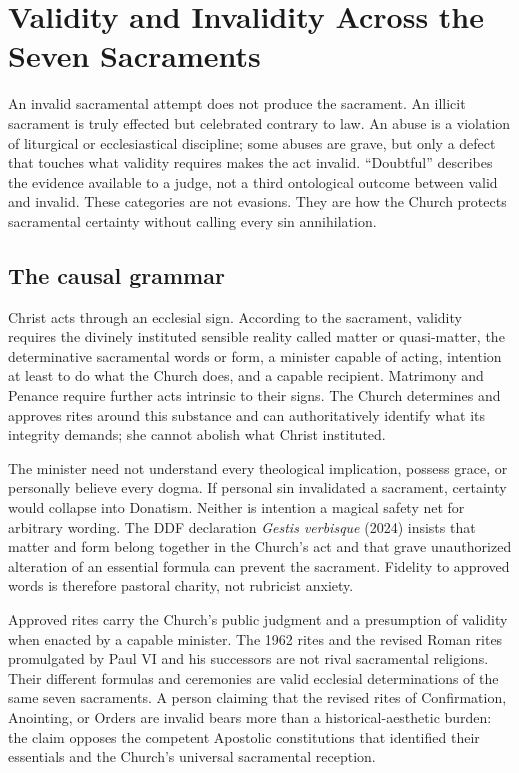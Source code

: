 \section{Validity and Invalidity Across the Seven Sacraments}

An invalid sacramental attempt does not produce the sacrament. An illicit sacrament is truly effected but celebrated contrary to law. An abuse is a violation of liturgical or ecclesiastical discipline; some abuses are grave, but only a defect that touches what validity requires makes the act invalid. “Doubtful” describes the evidence available to a judge, not a third ontological outcome between valid and invalid. These categories are not evasions. They are how the Church protects sacramental certainty without calling every sin annihilation.

\subsection{The causal grammar}

Christ acts through an ecclesial sign. According to the sacrament, validity requires the divinely instituted sensible reality called matter or quasi-matter, the determinative sacramental words or form, a minister capable of acting, intention at least to do what the Church does, and a capable recipient. Matrimony and Penance require further acts intrinsic to their signs. The Church determines and approves rites around this substance and can authoritatively identify what its integrity demands; she cannot abolish what Christ instituted.

The minister need not understand every theological implication, possess grace, or personally believe every dogma. If personal sin invalidated a sacrament, certainty would collapse into Donatism. Neither is intention a magical safety net for arbitrary wording. The DDF declaration \emph{Gestis verbisque} (2024) insists that matter and form belong together in the Church's act and that grave unauthorized alteration of an essential formula can prevent the sacrament. Fidelity to approved words is therefore pastoral charity, not rubricist anxiety.

Approved rites carry the Church's public judgment and a presumption of validity when enacted by a capable minister. The 1962 rites and the revised Roman rites promulgated by Paul VI and his successors are not rival sacramental religions. Their different formulas and ceremonies are valid ecclesial determinations of the same seven sacraments. A person claiming that the revised rites of Confirmation, Anointing, or Orders are invalid bears more than a historical-aesthetic burden: the claim opposes the competent Apostolic constitutions that identified their essentials and the Church's universal sacramental reception.


